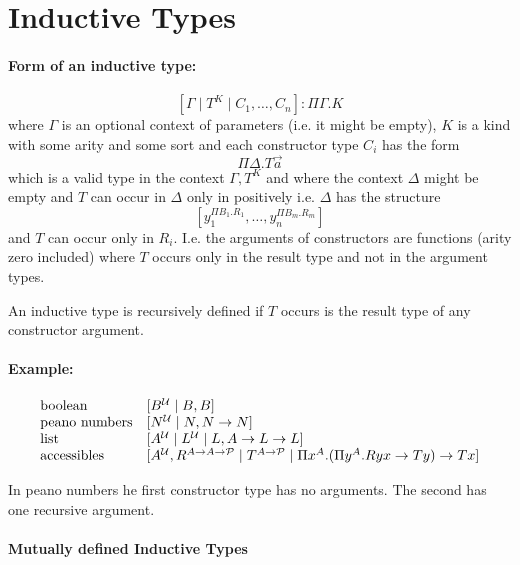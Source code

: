 \section {Inductive Types}


\paragraph{Form of an inductive type:}
$$
    [\Gamma \mid T^K \mid C_1, \ldots, C_n] : \Pi \Gamma. K
$$
where $\Gamma$ is an optional context of parameters (i.e. it might be empty),
$K$ is a kind with some arity and some sort and each constructor type
$C_i$ has the form
$$
    \Pi \Delta. T \vec a
$$
which is a valid type in the context $\Gamma, T^K$
and
where the context $\Delta$ might be empty and $T$ can occur in $\Delta$ only in
positively i.e. $\Delta$ has the structure
$$
    [y_1^{\Pi B_1. R_1}, \ldots, y_n^{\Pi B_m. R_m}]
$$
and $T$ can occur only in $R_i$. I.e. the arguments of constructors are
functions (arity zero included) where $T$ occurs only in the result type and not
in the argument types.

An inductive type is recursively defined if $T$ occurs is the result type of any
constructor argument.


\paragraph{Example:}
$$
    \begin{array}{lll}
        \text{boolean}
        &
        [B^{\cal U} \mid B, B]
        \\
        \text{peano numbers}
        &
        [N^{\cal U} \mid N, N\to N]
        \\
        \text{list}
        &
        [A^{\cal U} \mid L^{\cal U} \mid L, A \to L\to L]
        \\
        \text{accessibles}
        &
        [
            A^{\cal U}, R^{A \to A \to {\cal P}}
            \mid
            T^{A \to {\cal P}}
            \mid
            \Pi x^A. (\Pi y^A. R y x \to T y) \to T x
        ]
    \end{array}
$$

In peano numbers he first constructor type has no arguments. The second has one
recursive argument.



\paragraph{Mutually defined Inductive Types}

